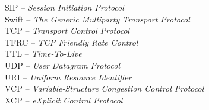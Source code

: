 SIP		-- \textit{Session Initiation Protocol}\\
Swift		-- \textit{The Generic Multiparty Transport Protocol}\\
TCP		-- \textit{Transport Control Protocol}\\
TFRC		-- \textit{TCP Friendly Rate Control}\\
TTL		-- \textit{Time-To-Live}\\
UDP		-- \textit{User Datagram Protocol}\\
URI		-- \textit{Uniform Resource Identifier}\\
VCP		-- \textit{Variable-Structure Congestion Control Protocol}\\
XCP		-- \textit{eXplicit Control Protocol}\\